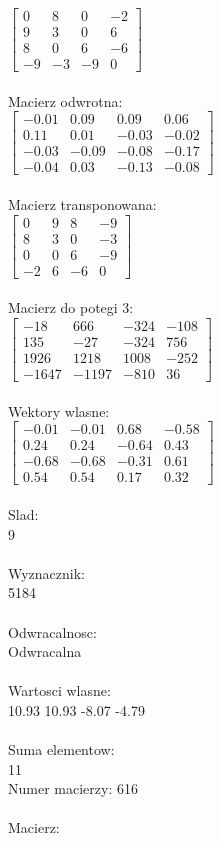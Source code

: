 \documentclass[a4paper,12pt]{article}
\begin{document}
$\begin{bmatrix} 0&8&0&-2\\9&3&0&6\\8&0&6&-6\\-9&-3&-9&0 \end{bmatrix}$
\\
\\
Macierz odwrotna:\\

$\begin{bmatrix} -0.01&0.09&0.09&0.06\\0.11&0.01&-0.03&-0.02\\-0.03&-0.09&-0.08&-0.17\\-0.04&0.03&-0.13&-0.08 \end{bmatrix}$
\\
\\
Macierz transponowana:\\

$\begin{bmatrix} 0&9&8&-9\\8&3&0&-3\\0&0&6&-9\\-2&6&-6&0 \end{bmatrix}$
\\
\\
Macierz do potegi 3:\\

$\begin{bmatrix} -18&666&-324&-108\\135&-27&-324&756\\1926&1218&1008&-252\\-1647&-1197&-810&36 \end{bmatrix}$
\\
\\
Wektory wlasne:\\

$\begin{bmatrix} -0.01&-0.01&0.68&-0.58\\0.24&0.24&-0.64&0.43\\-0.68&-0.68&-0.31&0.61\\0.54&0.54&0.17&0.32 \end{bmatrix}$
\\
\\
Slad:\\
9
\\
\\
Wyznacznik:\\
5184
\\
\\
Odwracalnosc:\\
Odwracalna
\\
\\
Wartosci wlasne:\\
10.93 10.93 -8.07 -4.79
\\
\\
Suma elementow:\\
11
\\
\newpage
Numer macierzy:
616
\\
\\
Macierz:\\
\end{document}
